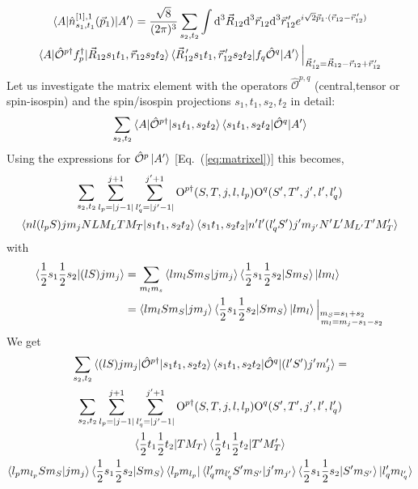\documentclass[10pt]{article}
\begin{document}
\begin{multline*}
	\braket{ A | \hat{n}_{s_1, t_1}^{[1],1}(\vec{p}_1) | A'} = 
\frac{\sqrt{8}}{(2 \pi)^{3}} \sum_{s_2,t_2} \int \text{d}^{3} \vec{R}_{12} 
\text{d}^{3} \vec{r}_{12} \text{d}^{3} \vec{r}_{12}^{\, \prime}  e^{ i \sqrt{2} 
\vec{p}_{1} \cdot ( \vec{r}_{12} - \vec{r}_{12}^{\, \prime}) } \\
	 \braket{ A | \hat{\mathcal{O}}^{p\dagger} f_{p}^{\dagger} | 
\vec{R}_{12} s_1 t_1, \vec{r}_{12} s_2 t_2 } \braket{ \vec{R}_{12}^{\, \prime} 
s_1 t_1 , \vec{r}_{12}^{\, \prime} s_2 t_2 | f_{q} \hat{ \mathcal{O}}^{q} | A'} 
\Big|_{\vec{R}_{12}^{\, \prime} = \vec{R}_{12} - \vec{r}_{12}  + 
\vec{r}_{12}^{\, \prime} }
\end{multline*}
Let us investigate the matrix element with the operators $ 
\hat{\mathcal{O}}^{p,q}$ (central,tensor or spin-isospin) and the spin/isospin 
projections $s_1,t_1,s_2,t_2$ in detail: 
\begin{align*}
\sum_{s_2,t_2} \braket{ A | \hat{\mathcal{O}}^{p\dagger} | s_1 t_1, s_2 t_2} 
\braket{ s_1 t_1, s_2 t_2 | \hat{ \mathcal{O}}^{q} | A'}
\end{align*}
Using the expressions for $ \hat{ \mathcal{O}}^{p}  \ket{ A'} $ 
[Eq.~(\ref{eq:matrixel})] this becomes,
\begin{multline*}
	 \sum_{s_2,t_2} \sum_{l_p = |j-1|}^{j+1} \sum_{l_q' = |j' - 1|}^{j'+1} 
\text{O}^{p \dagger}(S,T,j,l,l_p) \text{O}^{q}(S',T',j',l',l_q') \\
	 \braket{ nl (l_p S) j m_j N L M_L T M_T | s_1 t_1, s_2 t_2} \braket{ 
s_1 t_1, s_2 t_2 | n'l' (l_q' S') j' m_{j'} N' L' M_{L'} T' M_T'} \\
\end{multline*}
with
\begin{align*}
	\braket{ \frac{1}{2} s_1 \frac{1}{2} s_2 | (l S) j m_j} &= \sum_{m_l 
m_s} \braket{ l m_l S m_S | j m_j } \braket{   \frac{1}{2} s_1 \frac{1}{2} s_2 
| S m_S} \ket{ l m_l} \\
	&= \braket{ l m_l S m_S | j m_j } \braket{   \frac{1}{2} s_1 
\frac{1}{2} s_2 | S m_S} \ket{ l m_l} \Big|_{ \substack{ m_S = s_1 + s_2 
\phantom{ + m_j} \\ m_l = m_j - s_1 - s_2} }
\end{align*}
We get
\begin{multline*}
\sum_{s_2,t_2} \braket{ (lS)jm_j | \hat{\mathcal{O}}^{p\dagger} | s_1 t_1, s_2 
t_2} \braket{ s_1 t_1, s_2 t_2 | \hat{ \mathcal{O}}^{q} | (l'S')j'm'_j} = \\
 \sum_{s_2,t_2} \sum_{l_p = |j-1|}^{j+1} \sum_{l_q' = |j' - 1|}^{j'+1} 
\text{O}^{p \dagger}(S,T,j,l,l_p) \text{O}^{q}(S',T',j',l',l_q') \\
 	\braket{ \frac{1}{2} t_1 \frac{1}{2} t_2 | T M_T } \braket{ \frac{1}{2} 
t_1 \frac{1}{2} t_2 | T' M_T'} \\
	\braket{ l_p  m_{l_p} S m_S | j m_j } \braket{   \frac{1}{2} s_1 
\frac{1}{2} s_2 | S m_S} \bra{ l_p m_{l_p} }
	\braket{ l_q' m_{l'_q} S' m_{S'} | j' m_{j'} } \braket{   \frac{1}{2} 
s_1 \frac{1}{2} s_2 | S' m_{S'}} \ket{ l_q' m_{l'_q}}
\end{multline*}
\end{document}
